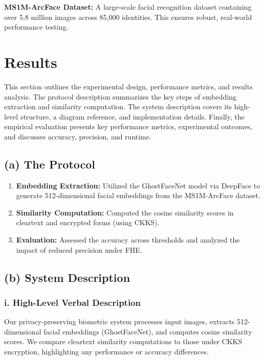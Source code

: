 \documentclass[12pt,a4paper]{article}
\begin{document}
\textbf{MS1M-ArcFace Dataset:} A large-scale facial recognition dataset containing over 5.8 million 
images across 85,000 identities. This ensures robust, real-world performance testing.

\section{Results}
This section outlines the experimental design, performance metrics, and results analysis. The protocol 
description summarizes the key steps of embedding extraction and similarity computation. The system 
description covers its high-level structure, a diagram reference, and implementation details. Finally, 
the empirical evaluation presents key performance metrics, experimental outcomes, and discusses 
accuracy, precision, and runtime.

\subsection{(a) The Protocol}
\begin{enumerate}
    \item \textbf{Embedding Extraction:} Utilized the GhostFaceNet model via DeepFace to generate 
    512-dimensional facial embeddings from the MS1M-ArcFace dataset.
    \item \textbf{Similarity Computation:} Computed the cosine similarity scores in cleartext 
    and encrypted forms (using CKKS).
    \item \textbf{Evaluation:} Assessed the accuracy across thresholds and analyzed the impact 
    of reduced precision under FHE.
\end{enumerate}

\subsection{(b) System Description}

\subsubsection*{i. High-Level Verbal Description}
Our privacy-preserving biometric system processes input images, extracts 512-dimensional facial 
embeddings (GhostFaceNet), and computes cosine similarity scores. We compare cleartext similarity 
computations to those under CKKS encryption, highlighting any performance or accuracy differences.
\end{document}
